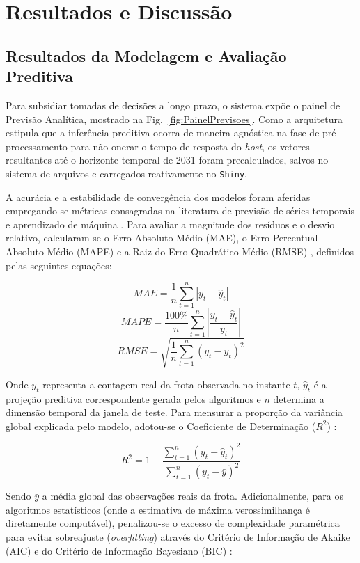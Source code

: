 \documentclass[12pt,a4paper]{article}
\begin{document}
\section{Resultados e Discussão}

\subsection{Resultados da Modelagem e Avaliação Preditiva}

Para subsidiar tomadas de decisões a longo prazo, o sistema expõe o painel de Previsão Analítica, mostrado na Fig.~\ref{fig:PainelPrevisoes}. Como a arquitetura estipula que a inferência preditiva ocorra de maneira agnóstica na fase de pré-processamento para não onerar o tempo de resposta do \textit{host}, os vetores resultantes até o horizonte temporal de 2031 foram precalculados, salvos no sistema de arquivos e carregados reativamente no \texttt{Shiny}.

A acurácia e a estabilidade de convergência dos modelos foram aferidas empregando-se métricas consagradas na literatura de previsão de séries temporais e aprendizado de máquina \cite{hyndman2021forecasting, goodfellow2016deep}. Para avaliar a magnitude dos resíduos e o desvio relativo, calcularam-se o Erro Absoluto Médio (MAE), o Erro Percentual Absoluto Médio (MAPE) e a Raiz do Erro Quadrático Médio (RMSE) \cite{hyndman2021forecasting}, definidos pelas seguintes equações:

$$MAE = \frac{1}{n} \sum_{t=1}^{n} |y_t - \hat{y}_t|$$
$$MAPE = \frac{100\%}{n} \sum_{t=1}^{n} \left| \frac{y_t - \hat{y}_t}{y_t} \right|$$
$$RMSE = \sqrt{\frac{1}{n} \sum_{t=1}^{n} (y_t - \hat{y}_t)^2}$$

Onde $y_t$ representa a contagem real da frota observada no instante $t$, $\hat{y}_t$ é a projeção preditiva correspondente gerada pelos algoritmos e $n$ determina a dimensão temporal da janela de teste. Para mensurar a proporção da variância global explicada pelo modelo, adotou-se o Coeficiente de Determinação ($R^2$) \cite{goodfellow2016deep}:

$$R^2 = 1 - \frac{\sum_{t=1}^{n} (y_t - \hat{y}_t)^2}{\sum_{t=1}^{n} (y_t - \bar{y})^2}$$

Sendo $\bar{y}$ a média global das observações reais da frota. Adicionalmente, para os algoritmos estatísticos (onde a estimativa de máxima verossimilhança é diretamente computável), penalizou-se o excesso de complexidade paramétrica para evitar sobreajuste (\textit{overfitting}) através do Critério de Informação de Akaike (AIC) e do Critério de Informação Bayesiano (BIC) \cite{box1970time, hyndman2021forecasting}:
\end{document}
